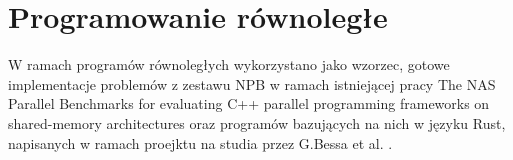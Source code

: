 \section{Programowanie równoległe}
W ramach programów równoległych wykorzystano jako wzorzec, gotowe implementacje problemów z zestawu NPB w ramach istniejącej pracy The NAS Parallel Benchmarks for evaluating C++ parallel programming frameworks on shared-memory architectures \cite{CPPNPB} oraz programów bazujących na nich w języku Rust, napisanych w ramach proejktu na studia przez G.Bessa et al. \cite{NPBRust}.